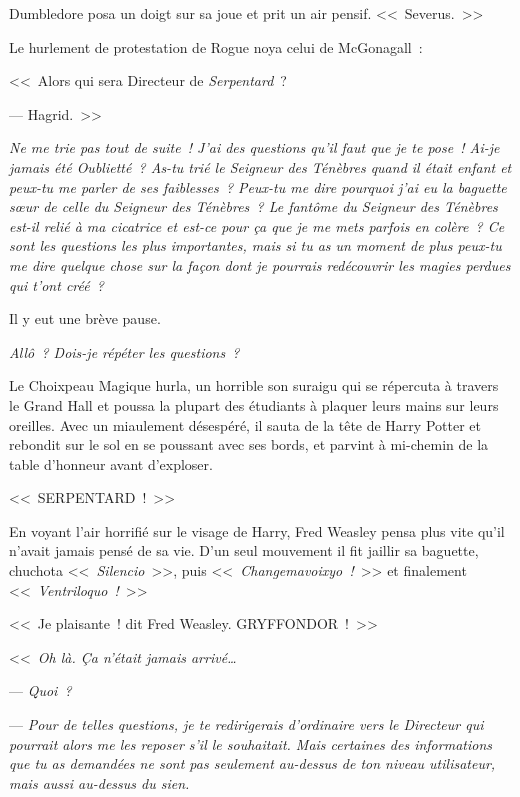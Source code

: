 Dumbledore posa un doigt sur sa joue et prit un air pensif. <<~Severus.~>>

Le hurlement de protestation de Rogue noya celui de McGonagall~:

<<~Alors qui sera Directeur de \emph{Serpentard}~?

--- Hagrid.~>>

\later

\emph{Ne me trie pas tout de suite~! J'ai des questions qu'il faut que je te pose~! Ai-je jamais été Oublietté~? As-tu trié le Seigneur des Ténèbres quand il était enfant et peux-tu me parler de ses faiblesses~? Peux-tu me dire pourquoi j'ai eu la baguette sœur de celle du Seigneur des Ténèbres~? Le fantôme du Seigneur des Ténèbres est-il relié à ma cicatrice et est-ce pour ça que je me mets parfois en colère~? Ce sont les questions les plus importantes, mais si tu as un moment de plus peux-tu me dire quelque chose sur la façon dont je pourrais redécouvrir les magies perdues qui t'ont créé~?}

Il y eut une brève pause.

\emph{Allô~? Dois-je répéter les questions~?}

Le Choixpeau Magique hurla, un horrible son suraigu qui se répercuta à travers le Grand Hall et poussa la plupart des étudiants à plaquer leurs mains sur leurs oreilles. Avec un miaulement désespéré, il sauta de la tête de Harry Potter et rebondit sur le sol en se poussant avec ses bords, et parvint à mi-chemin de la table d'honneur avant d'exploser.

\later

<<~SERPENTARD~!~>>

En voyant l'air horrifié sur le visage de Harry, Fred Weasley pensa plus vite qu'il n'avait jamais pensé de sa vie. D'un seul mouvement il fit jaillir sa baguette, chuchota <<~\emph{Silencio}~>>, puis <<~\emph{Changemavoixyo~!}~>> et finalement <<~\emph{Ventriloquo~!}~>>

<<~Je plaisante~! dit Fred Weasley. GRYFFONDOR~!~>>

\later

<<~\emph{Oh là. Ça n'était jamais arrivé…}

--- \emph{Quoi~?}

--- \emph{Pour de telles questions, je te redirigerais d'ordinaire vers le Directeur qui pourrait alors me les reposer s'il le souhaitait. Mais certaines des informations que tu as demandées ne sont pas seulement au-dessus de ton niveau utilisateur, mais aussi au-dessus du sien.}

